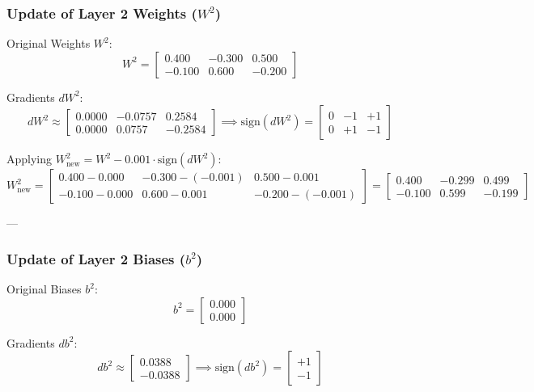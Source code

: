\documentclass[11pt]{article}
\begin{document}
\subsubsection{Update of Layer 2 Weights (\texorpdfstring{$W^2$}{W2})}

Original Weights $W^2$:
\[
W^2 =
\begin{bmatrix}
0.400 & -0.300 & 0.500 \\
-0.100 & 0.600 & -0.200
\end{bmatrix}
\]

Gradients $dW^2$:
\[
dW^2 \approx
\begin{bmatrix} 0.0000 & -0.0757 & 0.2584 \\ 0.0000 & 0.0757 & -0.2584 \end{bmatrix}
\implies
\text{sign}(dW^2) =
\begin{bmatrix} 0 & -1 & +1 \\ 0 & +1 & -1 \end{bmatrix}
\]

Applying $W^2_{\text{new}} = W^2 - 0.001 \cdot \text{sign}(dW^2)$:
\[
W^2_{\text{new}} =
\begin{bmatrix}
0.400 - 0.000 & -0.300 - (-0.001) & 0.500 - 0.001 \\
-0.100 - 0.000 & 0.600 - 0.001 & -0.200 - (-0.001)
\end{bmatrix}
=
\begin{bmatrix}
0.400 & -0.299 & 0.499 \\
-0.100 & 0.599 & -0.199
\end{bmatrix}
\]

---

\subsubsection{Update of Layer 2 Biases (\texorpdfstring{$b^2$}{b2})}

Original Biases $b^2$:
\[
b^2 = \begin{bmatrix} 0.000 \\ 0.000 \end{bmatrix}
\]

Gradients $db^2$:
\[
db^2 \approx \begin{bmatrix} 0.0388 \\ -0.0388 \end{bmatrix} \implies \text{sign}(db^2) = \begin{bmatrix} +1 \\ -1 \end{bmatrix}
\]
\end{document}
